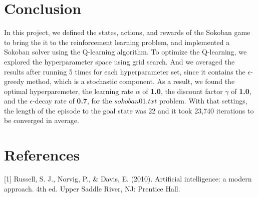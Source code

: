\documentclass{article}
\begin{document}
\section{Conclusion}
In this project, we defined the states, actions, and rewards of the Sokoban game to bring the it to the reinforcement learning problem, and implemented a Sokoban solver using the Q-learning algorithm. To optimize the Q-learning, we explored the hyperparameter space using grid search. And we averaged the results after running 5 times for each hyperparameter set, since it contains the $\epsilon$-greedy method, which is a stochastic component. As a result, we found the optimal hyperparemeter, the learning rate $\alpha$ of \textbf{1.0}, the discount factor $\gamma$ of \textbf{1.0}, and the $\epsilon$-decay rate of \textbf{0.7}, for the $sokoban01.txt$ problem. With that settings, the length of the episode to the goal state was 22 and it took 23,740 iterations to be converged in average.





\section{References}

[1] Russell, S. J., Norvig, P., \& Davis, E. (2010). Artificial intelligence: a modern approach. 4th ed. Upper Saddle River, NJ: Prentice Hall.

\end{document}
